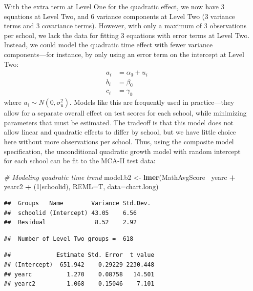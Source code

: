 \documentclass[
]{krantz}
\newenvironment{Shaded}{\begin{snugshade}}{\end{snugshade}}
\newcommand{\CommentTok}[1]{\textcolor[rgb]{0.37,0.37,0.37}{\textit{#1}}}
\newcommand{\DataTypeTok}[1]{\textcolor[rgb]{0.27,0.27,0.27}{#1}}
\newcommand{\DecValTok}[1]{\textcolor[rgb]{0.06,0.06,0.06}{#1}}
\newcommand{\KeywordTok}[1]{\textcolor[rgb]{0.27,0.27,0.27}{\textbf{#1}}}
\newcommand{\NormalTok}[1]{#1}
\newcommand{\OperatorTok}[1]{\textcolor[rgb]{0.43,0.43,0.43}{\textbf{#1}}}
\newcommand{\StringTok}[1]{\textcolor[rgb]{0.5,0.5,0.5}{#1}}
\begin{document}
With the extra term at Level One for the quadratic effect, we now have 3 equations at Level Two, and 6 variance components at Level Two (3 variance terms and 3 covariance terms). However, with only a maximum of 3 observations per school, we lack the data for fitting 3 equations with error terms at Level Two. Instead, we could model the quadratic time effect with fewer variance components---for instance, by only using an error term on the intercept at Level Two:\\
\begin{align*}
a_{i} & = \alpha_{0} + u_{i}\\
b_{i} & = \beta_{0}\\ 
c_{i} & = \gamma_{0}
\end{align*}
where \(u_{i}\sim N(0,\sigma^2_u)\). Models like this are frequently used in practice---they allow for a separate overall effect on test scores for each school, while minimizing parameters that must be estimated. The tradeoff is that this model does not allow linear and quadratic effects to differ by school, but we have little choice here without more observations per school. Thus, using the composite model specification, the unconditional quadratic growth model with random intercept for each school can be fit to the MCA-II test data:

\begin{Shaded}
\begin{Highlighting}[]
\CommentTok{# Modeling quadratic time trend}
\NormalTok{model.b2 <-}\StringTok{ }\KeywordTok{lmer}\NormalTok{(MathAvgScore}\OperatorTok{~}\StringTok{ }\NormalTok{yearc }\OperatorTok{+}\StringTok{ }\NormalTok{yearc2 }\OperatorTok{+}\StringTok{ }\NormalTok{(}\DecValTok{1}\OperatorTok{|}\NormalTok{schoolid), }
  \DataTypeTok{REML=}\NormalTok{T, }\DataTypeTok{data=}\NormalTok{chart.long)}
\end{Highlighting}
\end{Shaded}

\begin{verbatim}
##  Groups   Name        Variance Std.Dev.
##  schoolid (Intercept) 43.05    6.56    
##  Residual              8.52    2.92
\end{verbatim}

\begin{verbatim}
##  Number of Level Two groups =  618
\end{verbatim}

\begin{verbatim}
##             Estimate Std. Error  t value
## (Intercept)  651.942    0.29229 2230.448
## yearc          1.270    0.08758   14.501
## yearc2         1.068    0.15046    7.101
\end{verbatim}
\end{document}
